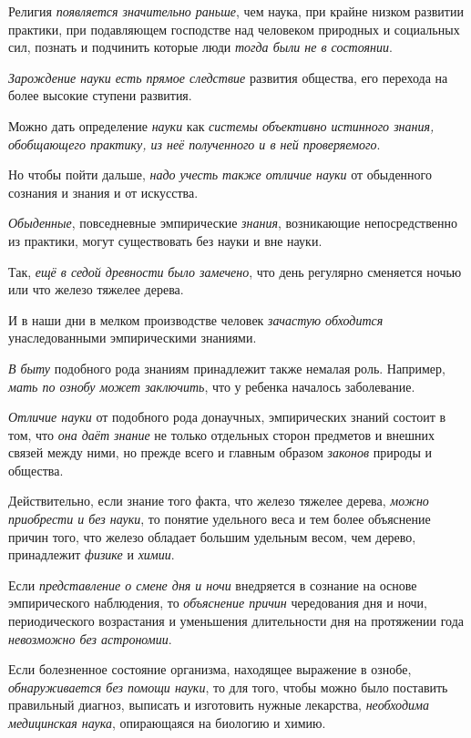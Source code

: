 \documentclass[a4paper,14pt,russian]{extreport}
\begin{document}
Религия \emph{появляется значительно раньше}, чем наука, при крайне низком развитии практики, при подавляющем господстве над человеком природных и социальных сил, познать и подчинить которые люди \emph{тогда были не в состоянии}.

\emph{Зарождение науки есть прямое следствие} развития общества, его перехода на более высокие ступени развития.

Можно дать определение \emph{науки} как \emph{системы объективно истинного знания, обобщающего практику, из неё полученного и в ней проверяемого}.

Но чтобы пойти дальше, \emph{надо учесть} \emph{также отличие науки} от обыденного сознания и знания и от искусства.

\emph{Обыденные}, повседневные эмпирические \emph{знания}, возникающие непосредственно из практики, могут существовать без науки и вне науки.

Так, \emph{ещё в седой древности} \emph{было замечено}, что день регулярно сменяется ночью или что железо тяжелее дерева.

И в наши дни в мелком производстве человек \emph{зачастую обходится} унаследованными эмпирическими знаниями.

\emph{В быту} подобного рода знаниям принадлежит также немалая роль. Например, \emph{мать по ознобу может заключить}, что у ребенка началось заболевание.

\emph{Отличие науки} от подобного рода донаучных, эмпирических знаний состоит в том, что \emph{она даёт знание} не только отдельных сторон предметов и внешних связей между ними, но прежде всего и главным образом \emph{законов} природы и общества.

Действительно, если знание того факта, что железо тяжелее дерева, \emph{можно приобрести и без науки}, то понятие удельного веса и тем более объяснение причин того, что железо обладает большим удельным весом, чем дерево, принадлежит \emph{физике} и \emph{химии}.

Если \emph{представление о смене дня и ночи} внедряется в сознание на основе эмпирического наблюдения, то \emph{объяснение причин} чередования дня и ночи, периодического возрастания и уменьшения длительности дня на протяжении года \emph{невозможно без астрономии}.

Если болезненное состояние организма, находящее выражение в ознобе, \emph{обнаруживается без помощи науки}, то для того, чтобы можно было поставить правильный диагноз, выписать и изготовить нужные лекарства, \emph{необходима медицинская наука}, опирающаяся на биологию и химию.
\end{document}
